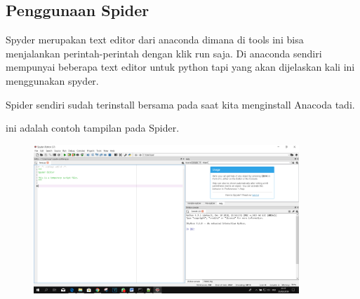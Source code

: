 \subsection{Penggunaan Spider}
Spyder merupakan text editor dari anaconda dimana di tools ini bisa menjalankan perintah-perintah dengan klik run saja. 
Di anaconda sendiri mempunyai beberapa text editor untuk python tapi yang akan dijelaskan kali ini menggunakan spyder.

Spider sendiri sudah terinstall bersama pada saat kita menginstall Anacoda tadi.

ini adalah contoh tampilan pada Spider.
\begin{figure}[H]
		\includegraphics[width=10cm]{figures/fahmi/3.png}
		\centering
	\end{figure}
